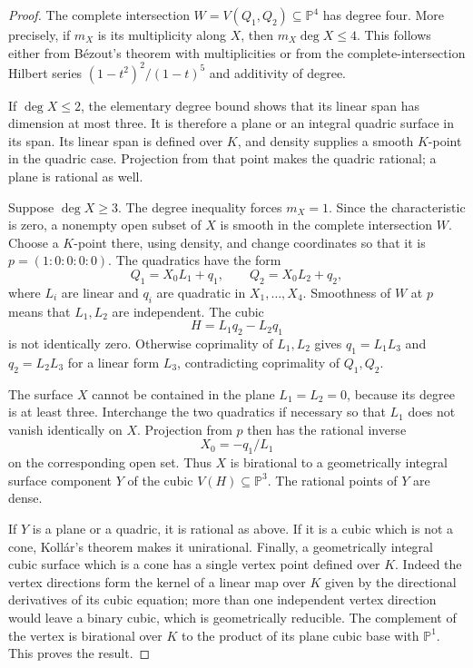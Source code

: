 \documentclass[11pt]{article}
\theoremstyle{definition}
\begin{document}
\begin{proof}
The complete intersection $W=V(Q_1,Q_2)\subseteq\mathbb P^4$
has degree four.  More precisely, if $m_X$ is its multiplicity along
$X$, then $m_X\deg X\leq4$.  This follows either from B\'ezout's
theorem with multiplicities or from the complete-intersection Hilbert
series $(1-t^2)^2/(1-t)^5$ and additivity of degree.

If $\deg X\leq2$, the elementary degree bound shows that its linear
span has dimension at most three.  It is therefore a plane or an
integral quadric surface in its span.  Its linear span is defined over
$K$, and density supplies a smooth $K$-point in the quadric case.
Projection from that point makes the quadric rational; a plane is
rational as well.

Suppose $\deg X\geq3$.  The degree inequality forces $m_X=1$.
Since the characteristic is zero, a nonempty open subset of $X$ is
smooth in the complete intersection $W$.  Choose a $K$-point there,
using density, and change coordinates so that it is
$p=(1:0:0:0:0)$.  The quadratics have the form
\[
 Q_1=X_0L_1+q_1,\qquad Q_2=X_0L_2+q_2,
\]
where $L_i$ are linear and $q_i$ are quadratic in $X_1,\ldots,X_4$.
Smoothness of $W$ at $p$ means that $L_1,L_2$ are independent.
The cubic
\[
 H=L_1q_2-L_2q_1
\]
is not identically zero.  Otherwise coprimality of $L_1,L_2$ gives
$q_1=L_1L_3$ and $q_2=L_2L_3$ for a linear form $L_3$, contradicting
coprimality of $Q_1,Q_2$.

The surface $X$ cannot be contained in the plane $L_1=L_2=0$,
because its degree is at least three.  Interchange the two quadratics
if necessary so that $L_1$ does not vanish identically on $X$.
Projection from $p$ then has the rational inverse
\[
 X_0=-q_1/L_1
\]
on the corresponding open set.  Thus $X$ is birational to a
geometrically integral surface component $Y$ of the cubic
$V(H)\subseteq\mathbb P^3$.  The rational points of $Y$ are dense.

If $Y$ is a plane or a quadric, it is rational as above.  If it is
a cubic which is not a cone, Koll\'ar's theorem makes it unirational.
Finally, a geometrically integral cubic surface which is a cone has
a single vertex point defined over $K$.  Indeed the vertex directions
form the kernel of a linear map over $K$ given by the directional
derivatives of its cubic equation; more than one independent vertex
direction would leave a binary cubic, which is geometrically reducible.
The complement of the vertex is birational over $K$ to the product
of its plane cubic base with $\mathbb P^1$.  This proves the result.
\end{proof}
\end{document}
